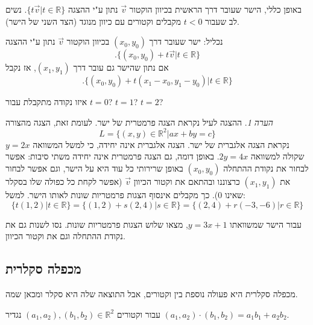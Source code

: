 \documentclass[
  hebrew,
  12pt,
  a4paper,
  oneside]{book}
\theoremstyle{definition}
\theoremstyle{remark}
\theoremstyle{plain}
\theoremstyle{remark}
\newtheorem*{remark}{הערה}
\begin{document}
באופן כללי, הישר שעובר דרך הראשית בכיוון הוקטור \(\vec{v}\) נתון ע"י
ההצגה \(\{t\vec{v}|t\in\mathbb{R}\}\). נשים לב שעבור \(t<0\) מקבלים
וקטורים עם כיוון מנוגד (הצד השני של הישר).

נכליל: ישר שעובר דרך \((x_{0},y_{0})\) בכיוון הוקטור \(\vec{v}\) נתון
ע"י ההצגה \[.\{(x_{0},y_{0})+t\vec{v}|t\in\mathbb{R}\}\] אם נתון שהישר
גם עובר דרך \((x_{1},y_{1})\), אז נקבל
\[.\{(x_{0},y_{0})+t(x_{1}-x_{0},y_{1}-y_{0})|t\in\mathbb{R}\}\]

\begin{exercise}

איזו נקודה מתקבלת עבור \(t=0\)? \(t=1\)? \(t=2\)?

\end{exercise}

\begin{remark}
ההצגה לעיל נקראת הצגה פרמטרית של ישר. לעומת זאת, הצגה מהצורה
\[L=\{(x,y)\in\mathbb{R}^{2}|ax+by=c\}\] נקראת הצגה אלגברית של ישר. הצגה
אלגברית אינה יחידה, כי למשל המשוואה \(y=2x\) שקולה למשוואה \(2y=4x\).
באופן דומה, גם הצגה פרמטרית אינה יחידה משתי סיבות: אפשר לבחור את נקודת
ההתחלה \((x_{0},y_{0})\) באופן שרירותי כל עוד היא על הישר, וגם אפשר
לבחור את \((x_{1},y_{1})\) כרצוננו ובהתאם את וקטור הכיוון \(\vec{v}\)
(אפשר לקחת כל כפולה שלו בסקלר שאינו \(0\)). כך מקבלים אינסוף הצגות
פרמטריות שונות לאותו הישר. למשל:
\[\{t(1,2)|t\in\mathbb{R}\}=\{(1,2)+s(2,4)|s\in\mathbb{R}\}=\{(2,4)+r(-3,-6)|r\in\mathbb{R}\}\]
\end{remark}

\begin{exercise}

עבור הישר שמשוואתו \(y=3x+1\), מצאו שלוש הצגות פרמטריות שונות. נסו לשנות
גם את נקודת ההתחלה וגם את וקטור הכיוון.

\end{exercise}

\subsection{מכפלה
סקלרית}\label{ux5deux5dbux5e4ux5dcux5d4-ux5e1ux5e7ux5dcux5e8ux5d9ux5ea}

מכפלה סקלרית היא פעולה נוספת בין וקטורים, אבל התוצאה שלה היא סקלר ומכאן
שמה.

\begin{definition}

\label{def:scalar-product-plane} עבור וקטורים
\((a_1,a_2),(b_1,b_2)\in\mathbb{R}^2\) נגדיר
\((a_{1},a_{2})\cdot(b_{1},b_{2})=a_{1}b_{1}+a_{2}b_{2}\).

\end{definition}
\end{document}
